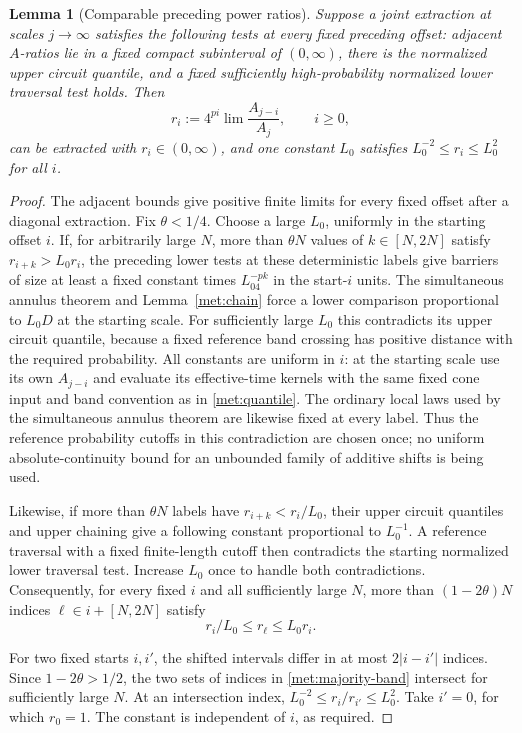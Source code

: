 \documentclass[11pt]{article}
\numberwithin{equation}{section}
\newtheorem{lemma}[theorem]{Lemma}
\theoremstyle{definition}
\theoremstyle{remark}
\newcommand{\1}{\mathbf 1}
\begin{document}
\begin{lemma}[Comparable preceding power ratios]
\label{met:majority}
Suppose a joint extraction at scales $j\to\infty$ satisfies the
following tests at every fixed preceding offset: adjacent
$A$-ratios lie in a fixed compact subinterval of $(0,\infty)$,
there is the normalized upper circuit quantile, and a fixed
sufficiently high-probability normalized lower traversal test
holds.  Then
\[
 r_i:=4^{pi}\lim\frac{A_{j-i}}{A_j},\qquad i\geq0,
\]
can be extracted with $r_i\in(0,\infty)$, and one constant $L_0$
satisfies $L_0^{-2}\leq r_i\leq L_0^2$ for all $i$.
\end{lemma}

\begin{proof}
The adjacent bounds give positive finite limits for every fixed
offset after a diagonal extraction.  Fix $\theta<1/4$.  Choose a
large $L_0$, uniformly in the starting offset $i$.
If, for arbitrarily large $N$, more than $\theta N$ values of
$k\in[N,2N]$ satisfy $r_{i+k}>L_0r_i$, the preceding lower tests
at these deterministic labels give barriers of size at least a
fixed constant times $L_04^{-pk}$ in the start-$i$ units.
The simultaneous annulus theorem and
Lemma~\ref{met:chain} force a lower comparison proportional to
$L_0D$ at the starting scale.  For sufficiently large $L_0$ this
contradicts its upper circuit quantile, because a fixed reference
band crossing has positive distance with the required probability.
All constants are uniform in $i$: at the starting scale use its own
$A_{j-i}$ and evaluate its effective-time kernels with the same fixed
cone input and band convention as in \eqref{met:quantile}.  The
ordinary local laws used by the simultaneous annulus theorem are
likewise fixed at every label.  Thus the reference probability cutoffs
in this contradiction are chosen once; no uniform absolute-continuity
bound for an unbounded family of additive shifts is being used.

Likewise, if more than $\theta N$ labels have
$r_{i+k}<r_i/L_0$, their upper circuit quantiles and upper chaining
give a following constant proportional to $L_0^{-1}$.  A reference
traversal with a fixed finite-length cutoff then contradicts the
starting normalized lower traversal test.  Increase $L_0$ once to
handle both contradictions.  Consequently, for every fixed $i$
and all sufficiently large $N$, more than
$(1-2\theta)N$ indices $\ell\in i+[N,2N]$ satisfy
\begin{equation}
 r_i/L_0\leq r_\ell\leq L_0r_i.
 \label{met:majority-band}
\end{equation}

For two fixed starts $i,i'$, the shifted intervals differ in at
most $2|i-i'|$ indices.  Since $1-2\theta>1/2$, the two sets of
indices in \eqref{met:majority-band} intersect for sufficiently
large $N$.  At an intersection index,
$L_0^{-2}\leq r_i/r_{i'}\leq L_0^2$.  Take $i'=0$, for which
$r_0=1$.  The constant is independent of $i$, as required.
\end{proof}
\end{document}
